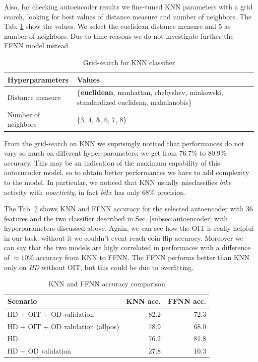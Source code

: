 Also, for checking autoencoder results we fine-tuned KNN parameters
with a grid search, looking for best values of distance measure and
number of neighbors. The Tab. \ref{tab:knn-grid-search} show the values.
We select the euclidean distance measure and $5$ as number of neighbors.
Due to time reasons we do not investigate further the FFNN model instead.
\begin{table}[H]
  \centering
  \begin{tabular}{p{2cm}p{4.5cm}}
    \hline
    Hyperparameters & Values \\
    \hline
    Distance measure & \{\textbf{euclidean}, manhattan, chebyshev, minkowski, standardized euclidean, mahalanobis\} \\
    Number of neighbors & \{3, 4, \textbf{5}, 6, 7, 8\} \\
    \hline
  \end{tabular}
  \caption{Grid-search for KNN classifier}
  \label{tab:knn-grid-search}
\end{table}

From the grid-search on KNN we suprisingly noticed that performances
do not vary so much on different hyper-parameters: we get from
$76.7$\% to $80.9$\% accuracy. This may be an indication of the
maximum capability of this autoencoder model, so to obtain better
performances we have to add complexity to the model. In particular, we
noticed that KNN usually misclassifies \textit{bike} activity with
\textit{no\textunderscore activity}, in fact \textit{bike} has only
$68$\% precision.

The Tab. \ref{tab:ae-classifiers-accuracy} shows KNN and FFNN accuracy
for the selected autoencoder with $36$ features and the two classifier
described in Sec. \ref{subsec:autoencoder} with hyperparameters
discussed above. Again, we can see how the OIT is really helpful in
our task: without it we couldn't event reach coin-flip
accuracy. Moreover we can say that the two models are higly correlated
in performaces with a difference of $\approx 10$\% accuracy from KNN
to FFNN. The FFNN performs better than KNN only on \textit{HD} without
OIT, but this could be due to overfitting.

\begin{table}[H]
  \centering
  \begin{tabular}{p{4cm}rr}
    \hline
    Scenario & KNN acc. & FFNN acc. \\
    \hline
    HD + OIT + OD validation & 82.2  & 72.3 \\
    HD + OIT + OD validation (allpos) &  78.9 & 68.0 \\
    HD & 76.2 & 81.8 \\
    HD + OD validation & 27.8 & 10.3 \\
    \hline
  \end{tabular}
  \caption{KNN and FFNN accuracy comparison}
  \label{tab:ae-classifiers-accuracy}
\end{table}

